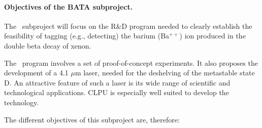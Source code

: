\paragraph{Objectives of the BATA subproject.}

The \BATA\ subproject will focus on the R\&D program needed to clearly establish the feasibility of tagging (e.g., detecting) the barium (Ba$^{++}$) ion produced in the double beta decay of xenon. 

The \BATA\ program involves a set of proof-of-concept experiments. It also proposes the development of a 4.1 $\mu$m laser, needed for the deshelving of the metastable state D. An attractive feature of such a laser is its wide range of scientific and technological applications. CLPU is especially well suited to develop the technology.

The different objectives of this subproject are, therefore:

